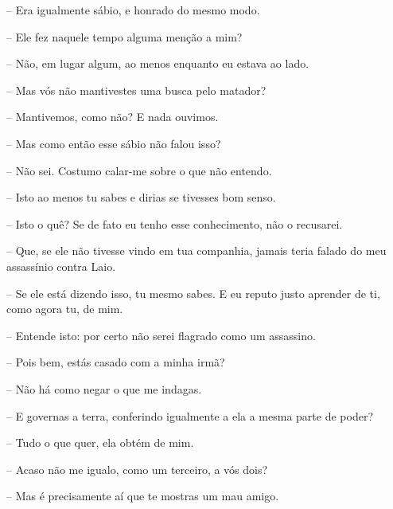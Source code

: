  --   Era igualmente sábio, e honrado do mesmo modo.

 --   Ele fez naquele tempo alguma menção a mim?

 --   Não, em lugar algum, ao menos enquanto eu estava ao lado.

 --   Mas vós não mantivestes uma busca pelo matador?

 --   Mantivemos, como não? E nada ouvimos.

 --   Mas como então esse sábio não falou isso?

 --   Não sei. Costumo calar-me sobre o que não entendo.

 --    Isto ao menos tu sabes e dirias se tivesses bom senso.

 --   Isto o quê? Se de fato eu tenho esse conhecimento, não o recusarei.

 --   Que, se ele não tivesse vindo em tua companhia, jamais teria falado do
meu assassínio contra Laio.

 --   Se ele está dizendo isso, tu mesmo sabes. E eu reputo justo aprender de
ti, como agora tu, de mim.

 --   Entende isto: por certo não serei flagrado como um assassino.

 --   Pois bem, estás casado com a minha irmã?

 --   Não há como negar o que me indagas.

 --   E governas a terra, conferindo igualmente a ela a mesma parte de poder?

 --    Tudo o que quer, ela obtém de mim.

 --   Acaso não me igualo, como um terceiro, a vós dois?

 --   Mas é precisamente aí que te mostras um mau amigo.


